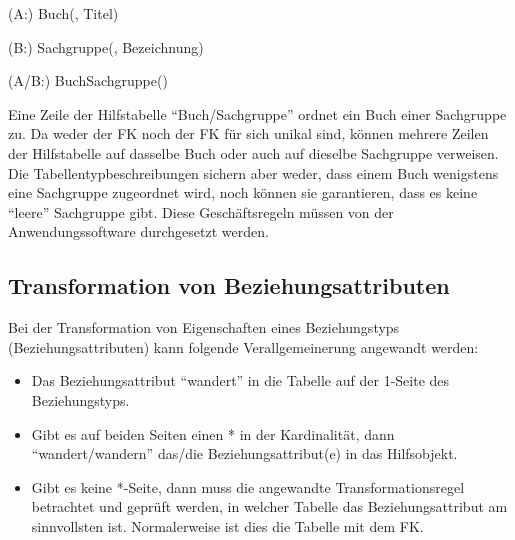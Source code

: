           \begin{center}
          \end{center}
          \begin{small}
            (A:) Buch(, Titel)

            (B:) Sachgruppe(, Bezeichnung)

            (A/B:) BuchSachgruppe()
          \end{small}
          
          Eine Zeile der Hilfstabelle \enquote{Buch/Sachgruppe} ordnet ein Buch
          einer Sachgruppe zu. Da weder der FK  noch der FK
           für sich unikal sind, können mehrere Zeilen
          der Hilfstabelle auf dasselbe Buch oder auch auf dieselbe Sachgruppe
          verweisen. Die Tabellentypbeschreibungen sichern aber weder, dass
          einem Buch wenigstens eine Sachgruppe zugeordnet wird, noch können
          sie garantieren, dass es keine \enquote{leere} Sachgruppe gibt. Diese
          Geschäftsregeln müssen von der Anwendungssoftware durchgesetzt
          werden.
      \subsection{Transformation von Beziehungsattributen}
        Bei der Transformation von Eigenschaften eines Beziehungstyps (Beziehungsattributen) kann folgende Verallgemeinerung angewandt werden:
        \begin{itemize}
          \item Das Beziehungsattribut \enquote{wandert} in die Tabelle auf der 1-Seite des Beziehungstyps.
          \item Gibt es auf beiden Seiten einen * in der Kardinalität, dann \enquote{wandert/wandern} das/die Beziehungsattribut(e) in das Hilfsobjekt.
          \item Gibt es keine *-Seite, dann muss die angewandte Transformationsregel betrachtet und geprüft werden, in welcher Tabelle das Beziehungsattribut am sinnvollsten ist. Normalerweise ist dies die Tabelle mit dem FK.
        \end{itemize}
